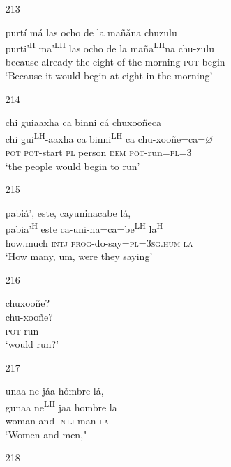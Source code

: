 \begin{itemize}
\item[213]
 
\glll   purt\'{i} m\'{a} las ocho de la ma\~{n}\v{a}na chuzulu\\
purti'\textsuperscript{H} ma'\textsuperscript{LH} las ocho de la ma\~{n}a\textsuperscript{LH}na chu-zulu\\
because already the eight of the morning \textsc{pot}-begin\\
\glt `Because it would begin at eight in the morning'
 


\item[214]
 
\glll   chi guiaaxha ca binni c\'{a} chuxoo\~{n}eca\\
chi gui\textsuperscript{LH}-aaxha ca binni\textsuperscript{LH} ca chu-xoo\~{n}e=ca=$\varnothing$\\
\textsc{pot} \textsc{pot}-start \textsc{pl} person \textsc{dem} \textsc{pot}-run=\textsc{pl}=\textsc{3}\\
\glt `the people would begin to run'
 



\item[215]
 
\glll   pabi\'{a}', este, cayuninacabe l\'{a},\\
pabia'\textsuperscript{H} este ca-uni-na=ca=be\textsuperscript{LH} la\textsuperscript{H}\\
how.much \textsc{intj} \textsc{prog}-do-say=\textsc{pl}=\textsc{3sg.hum} \textsc{la}\\
\glt `How many, um, were they saying'
 



\item[216]
 
\glll   chuxoo\~{n}e?\\
chu-xoo\~{n}e?\\
\textsc{pot}-run\\
\glt `would run?'
 


\item[217]
 
\glll   unaa ne j\'{a}a h\v{o}mbre l\'{a}, \\
gunaa ne\textsuperscript{LH} jaa hombre la \\
woman and \textsc{intj} man \textsc{la}\\
\glt `Women and men,"
 


\item[218]
 

\end{itemize}

